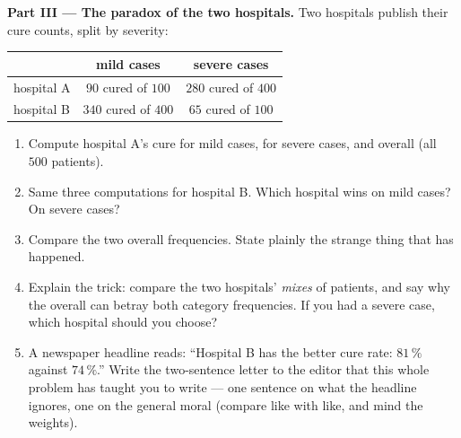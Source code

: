 \begin{problem}
\medskip
\noindent\textbf{Part III --- The paradox of the two
hospitals.}
Two hospitals publish their cure counts, split by severity:
\begin{center}
\renewcommand{\arraystretch}{1.3}
\begin{tabular}{l|cc}
 & mild cases & severe cases \\
\hline
hospital A & $90$ cured of $100$ & $280$ cured of $400$ \\
hospital B & $340$ cured of $400$ & $65$ cured of $100$ \\
\end{tabular}
\end{center}
\begin{enumerate}[resume]
  \item Compute hospital A's cure  for mild cases, for
        severe cases, and overall (all $500$ patients).
  \item Same three computations for hospital B. Which hospital
        wins on mild cases? On severe cases?
  \item Compare the two overall frequencies. State plainly the
        strange thing that has happened.
  \item Explain the trick: compare the two hospitals'
        \emph{mixes} of patients, and say why the overall
         can betray both category frequencies. If you
        had a severe case, which hospital should you choose?
  \item A newspaper headline reads: ``Hospital B has the better
        cure rate: $81\,\%$ against $74\,\%$.'' Write the
        two-sentence letter to the editor that this whole
        problem has taught you to write --- one sentence on
        what the headline ignores, one on the general moral
        (compare like with like, and mind the weights).
\end{enumerate}
\end{problem}
